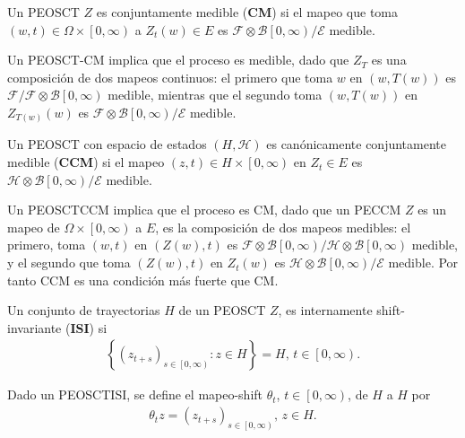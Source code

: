 \begin{Def}
Un PEOSCT $Z$ es conjuntamente medible (\textbf{CM}) si el mapeo que toma $\left(w,t\right)\in\Omega\times\left[0,\infty\right)$ a $Z_{t}\left(w\right)\in E$ es $\mathcal{F}\otimes\mathcal{B}\left[0,\infty\right)/\mathcal{E}$ medible.
\end{Def}

\begin{Note}
Un PEOSCT-CM implica que el proceso es medible, dado que $Z_{T}$ es una composici\'on  de dos mapeos continuos: el primero que toma $w$ en $\left(w,T\left(w\right)\right)$ es $\mathcal{F}/\mathcal{F}\otimes\mathcal{B}\left[0,\infty\right)$ medible, mientras que el segundo toma $\left(w,T\left(w\right)\right)$ en $Z_{T\left(w\right)}\left(w\right)$ es $\mathcal{F}\otimes\mathcal{B}\left[0,\infty\right)/\mathcal{E}$ medible.
\end{Note}


\begin{Def}
Un PEOSCT con espacio de estados $\left(H,\mathcal{H}\right)$ es can\'onicamente conjuntamente medible (\textbf{CCM}) si el mapeo $\left(z,t\right)\in H\times\left[0,\infty\right)$ en $Z_{t}\in E$ es $\mathcal{H}\otimes\mathcal{B}\left[0,\infty\right)/\mathcal{E}$ medible.
\end{Def}

\begin{Note}
Un PEOSCTCCM implica que el proceso es CM, dado que un PECCM $Z$ es un mapeo de $\Omega\times\left[0,\infty\right)$ a $E$, es la composici\'on de dos mapeos medibles: el primero, toma $\left(w,t\right)$ en $\left(Z\left(w\right),t\right)$ es $\mathcal{F}\otimes\mathcal{B}\left[0,\infty\right)/\mathcal{H}\otimes\mathcal{B}\left[0,\infty\right)$ medible, y el segundo que toma $\left(Z\left(w\right),t\right)$  en $Z_{t}\left(w\right)$ es $\mathcal{H}\otimes\mathcal{B}\left[0,\infty\right)/\mathcal{E}$ medible. Por tanto CCM es una condici\'on m\'as fuerte que CM.
\end{Note}

\begin{Def}
Un conjunto de trayectorias $H$ de un PEOSCT $Z$, es internamente shift-invariante (\textbf{ISI}) si 
\begin{eqnarray*}
\left\{\left(z_{t+s}\right)_{s\in\left[0,\infty\right)}:z\in H\right\}=H\textrm{, }t\in\left[0,\infty\right).
\end{eqnarray*}
\end{Def}


\begin{Def}
Dado un PEOSCTISI, se define el mapeo-shift $\theta_{t}$, $t\in\left[0,\infty\right)$, de $H$ a $H$ por 
\begin{eqnarray*}
\theta_{t}z=\left(z_{t+s}\right)_{s\in\left[0,\infty\right)}\textrm{, }z\in H.
\end{eqnarray*}
\end{Def}

